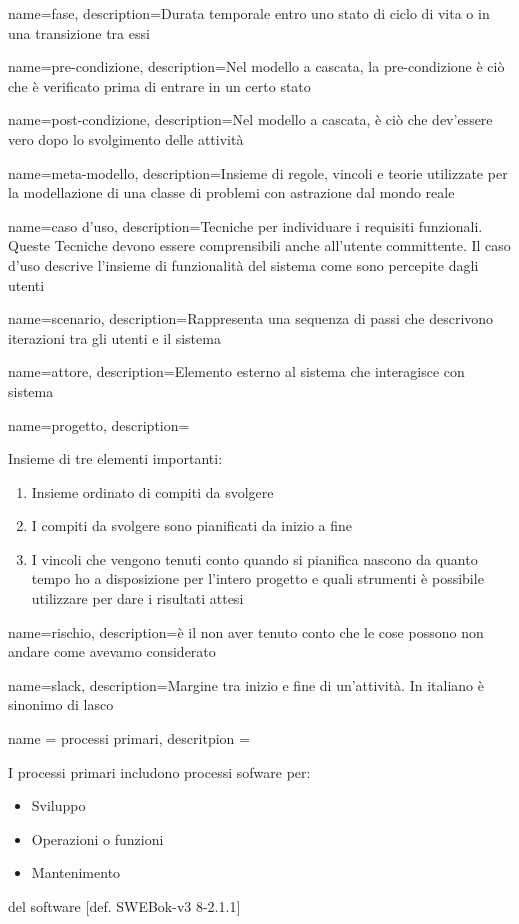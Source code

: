 {
name=fase,
description={Durata temporale entro uno stato di ciclo di vita o in una transizione tra essi}
}


{
name=pre-condizione,
description={Nel modello a cascata, la pre-condizione \`e ci\`o che \`e verificato prima di entrare in un certo stato}
}

{
name=post-condizione,
description={Nel modello a cascata, \`e ci\`o che dev'essere vero dopo lo svolgimento delle attivit\`a}
}

{
name=meta-modello,
description={Insieme di regole, vincoli e teorie utilizzate per la modellazione di una classe di problemi con astrazione dal mondo reale}
}

{
name=caso d'uso,
description={Tecniche per individuare i requisiti funzionali. Queste Tecniche devono essere comprensibili anche all'utente committente. Il caso d'uso descrive l'insieme di funzionalit\`a del sistema come sono percepite dagli utenti}
}

{
name=scenario,
description={Rappresenta una sequenza di passi che descrivono iterazioni tra gli utenti e il sistema}
}

{
name=attore,
description={Elemento esterno al sistema che interagisce con sistema}
}

{
name=progetto,
description={Insieme di tre elementi importanti: \begin{enumerate}
\item Insieme ordinato di compiti da svolgere
\item I compiti da svolgere sono pianificati da inizio a fine
\item I vincoli che vengono tenuti conto quando si pianifica nascono da quanto tempo ho a disposizione per l'intero progetto e quali strumenti \`e possibile utilizzare per dare i risultati attesi
\end{enumerate}
}
}

{
name=rischio,
description={\`e il non aver tenuto conto che le cose possono non andare come avevamo considerato}
}

{
name=slack,
description={Margine tra inizio e fine di un'attivit\`a. In italiano \`e sinonimo di lasco}
}

{
name = processi primari,
descritpion = {I processi primari includono processi sofware per: \begin{itemize}
\item Sviluppo
\item Operazioni o funzioni
\item Mantenimento
\end{itemize}
del software [def. SWEBok-v3 8-2.1.1]}
}


